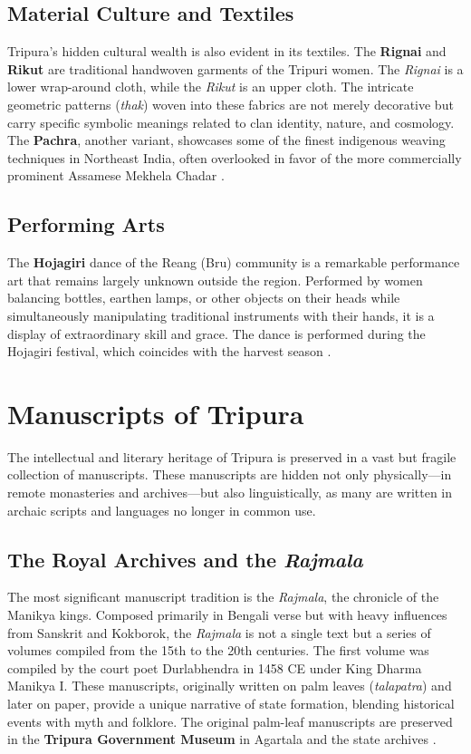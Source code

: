 \documentclass{article}
\begin{document}
\subsection{Material Culture and Textiles}
Tripura's hidden cultural wealth is also evident in its textiles. The \textbf{Rignai} and \textbf{Rikut} are traditional handwoven garments of the Tripuri women. The \textit{Rignai} is a lower wrap-around cloth, while the \textit{Rikut} is an upper cloth. The intricate geometric patterns (\textit{thak}) woven into these fabrics are not merely decorative but carry specific symbolic meanings related to clan identity, nature, and cosmology. The \textbf{Pachra}, another variant, showcases some of the finest indigenous weaving techniques in Northeast India, often overlooked in favor of the more commercially prominent Assamese Mekhela Chadar \cite{goswami2019}.

\subsection{Performing Arts}
The \textbf{Hojagiri} dance of the Reang (Bru) community is a remarkable performance art that remains largely unknown outside the region. Performed by women balancing bottles, earthen lamps, or other objects on their heads while simultaneously manipulating traditional instruments with their hands, it is a display of extraordinary skill and grace. The dance is performed during the Hojagiri festival, which coincides with the harvest season \cite{singh2015}.

\section{Manuscripts of Tripura}

The intellectual and literary heritage of Tripura is preserved in a vast but fragile collection of manuscripts. These manuscripts are hidden not only physically—in remote monasteries and archives—but also linguistically, as many are written in archaic scripts and languages no longer in common use.

\subsection{The Royal Archives and the \textit{Rajmala}}
The most significant manuscript tradition is the \textit{Rajmala}, the chronicle of the Manikya kings. Composed primarily in Bengali verse but with heavy influences from Sanskrit and Kokborok, the \textit{Rajmala} is not a single text but a series of volumes compiled from the 15th to the 20th centuries. The first volume was compiled by the court poet Durlabhendra in 1458 CE under King Dharma Manikya I. These manuscripts, originally written on palm leaves (\textit{talapatra}) and later on paper, provide a unique narrative of state formation, blending historical events with myth and folklore. The original palm-leaf manuscripts are preserved in the \textbf{Tripura Government Museum} in Agartala and the state archives \cite{bhattacharya2012}.
\end{document}
